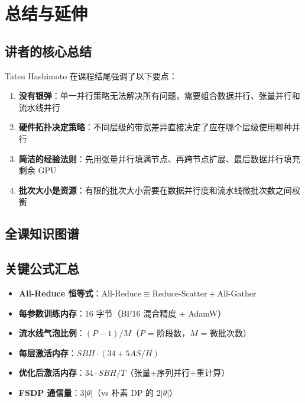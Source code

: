 \section{总结与延伸}

\subsection{讲者的核心总结}

Tatsu Hashimoto 在课程结尾强调了以下要点：

\begin{enumerate}
    \item \textbf{没有银弹}：单一并行策略无法解决所有问题，需要组合数据并行、张量并行和流水线并行
    \item \textbf{硬件拓扑决定策略}：不同层级的带宽差异直接决定了应在哪个层级使用哪种并行
    \item \textbf{简洁的经验法则}：先用张量并行填满节点、再跨节点扩展、最后数据并行填充剩余 GPU
    \item \textbf{批次大小是资源}：有限的批次大小需要在数据并行度和流水线微批次数之间权衡
\end{enumerate}

\subsection{全课知识图谱}

\begin{center}
\end{center}

\subsection{关键公式汇总}

\begin{itemize}
    \item \textbf{All-Reduce 恒等式}：$\text{All-Reduce} \equiv \text{Reduce-Scatter} + \text{All-Gather}$
    \item \textbf{每参数训练内存}：$16$ 字节（BF16 混合精度 + AdamW）
    \item \textbf{流水线气泡比例}：$(P-1)/M$（$P$ = 阶段数，$M$ = 微批次数）
    \item \textbf{每层激活内存}：$SBH \cdot (34 + 5AS/H)$
    \item \textbf{优化后激活内存}：$34 \cdot SBH / T$（张量+序列并行+重计算）
    \item \textbf{FSDP 通信量}：$3|\theta|$（vs 朴素 DP 的 $2|\theta|$）
\end{itemize}


